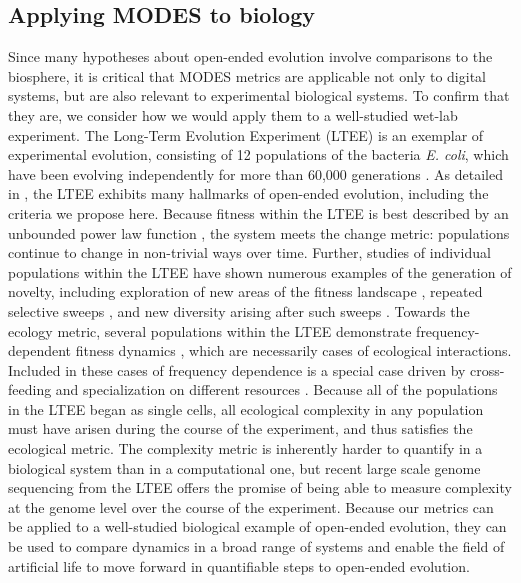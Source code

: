 \documentclass[letterpaper]{article}
\begin{document}
\subsection{Applying MODES to biology}

Since many hypotheses about open-ended evolution involve comparisons to the biosphere, it is critical that MODES metrics are applicable not only to digital systems, but are also relevant to experimental biological systems. To confirm that they are, we consider how we would apply them to a well-studied wet-lab experiment. The Long-Term Evolution Experiment (LTEE) \citep{lenski_long-term_1991} is an exemplar of experimental evolution, consisting of 12 populations of the bacteria \textit{E. coli}, which have been evolving independently for more than 60,000 generations \citep{good_dynamics_2017}.  As detailed in \citep{taylor_open-ended_2016}, the LTEE exhibits many hallmarks of open-ended evolution, including the criteria we propose here.  Because fitness within the LTEE is best described by an unbounded power law function \citep{wiser_long-term_2013,lenski_sustained_2015}, the system meets the change metric: populations continue to change in non-trivial ways over time.  Further, studies of individual populations within the LTEE have shown numerous examples of the generation of novelty, including exploration of new areas of the fitness landscape \citep{tenaillon_tempo_2016}, repeated selective sweeps \citep{maddamsetti_adaptation_2015}, and new diversity arising after such sweeps \citep{blount_genomic_2012}.   Towards the ecology metric, several populations within the LTEE demonstrate frequency-dependent fitness dynamics \citep{ribeck_modeling_2015,rozen_longterm_2000,le_gac_ecological_2012,maddamsetti_adaptation_2015}, which are necessarily cases of ecological interactions.  Included in these cases of frequency dependence is a special case \citep{blount_historical_2008,blount_genomic_2012,turner_replaying_2015} driven by cross-feeding and specialization on different resources \citep{turner_evolution_2015}.  Because all of the populations in the LTEE began as single cells, all ecological complexity in any population must have arisen during the course of the experiment, and thus satisfies the  ecological metric.  The complexity metric is inherently harder to quantify in a biological system than in a computational one, but recent large scale genome sequencing from the LTEE \citep{tenaillon_tempo_2016} offers the promise of being able to measure complexity at the genome level over the course of the experiment. Because our metrics can be applied to a well-studied biological example of open-ended evolution, they can be used to compare dynamics in a broad range of systems and enable the field of artificial life to move forward in quantifiable steps to open-ended evolution.
\end{document}
